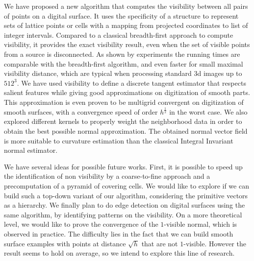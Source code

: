 We have proposed a new algorithm that computes the visibility between
all pairs of points on a digital surface. It uses the specificity of a
structure to represent sets of lattice points or cells with a mapping
from projected coordinates to list of integer intervals. Compared to a
classical breadth-first approach to compute visibility, it provides
the exact visibility result, even when the set of visible points from
a source is disconnected. As shown by experiments the running times
are comparable with the breadth-first algorithm, and even faster for
small maximal visibility distance, which are typical when processing
standard 3d images up to $512^3$. We have used visibility to define a
discrete tangent estimator that respects salient features while giving
good approximations on digitization of smooth parts.  This
approximation is even proven to be multigrid convergent on
digitization of smooth surfaces, with a convergence speed of order
$h^{\frac{1}{2}}$ in the worst case. We also explored different
kernels to properly weight the neighborhood data in order to obtain
the best possible normal approximation. The obtained normal vector
field is more suitable to curvature estimation than the classical
Integral Invariant normal estimator.


We have several ideas for possible future works. First, it is possible
to speed up the identification of non visibility by a coarse-to-fine
approach and a precomputation of a pyramid of covering cells. We would
like to explore if we can build such a top-down variant of our
algorithm, considering the primitive vectors as a hierarchy. We
finally plan to do edge detection on digital surfaces using the same
algorithm, by identifying patterns on the visibility. On a more
theoretical level, we would like to prove the convergence of the
$1$-visible normal, which is observed in practice. The difficulty lies
in the fact that we can build smooth surface examples with points at
distance $\sqrt{h}$ that are not $1$-visible. However the result seems
to hold on average, so we intend to explore this line of research.
